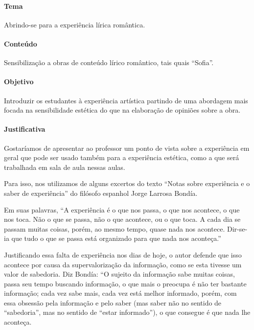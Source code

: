 \documentclass[12pt]{extarticle}
\begin{document}
\paragraph{Tema} Abrindo-se para a experiência lírica romântica.

\paragraph{Conteúdo} Sensibilização a obras de conteúdo lírico romântico,
tais quais ``Sofia''.

\paragraph{Objetivo} Introduzir os estudantes à experiência artística
partindo de uma abordagem mais focada na sensibilidade estética do que
na elaboração de opiniões sobre a obra. 

\paragraph{Justificativa} Gostaríamos de apresentar ao professor um
ponto de vista sobre a experiência em geral que pode ser usado
também para a experiência estética, como a que será trabalhada em 
sala de aula nessas aulas. 

Para isso, nos utilizamos de alguns excertos do texto ``Notas sobre
experiência e o saber de experiência'' do filósofo espanhol Jorge
Larrosa Bondía. 

Em suas palavras, ``A experiência é o que nos passa, 
o que nos acontece, o que nos toca. Não o que se passa, não o que acontece, ou o que toca. A cada dia se 
passam muitas coisas, porém, ao mesmo tempo, quase nada nos acontece. 
Dir-se-ia que tudo o que se passa está organizado para que nada nos aconteça.''

Justificando essa falta de experiência nos dias de hoje, 
o autor defende que isso acontece por causa da supervalorização
da informação, como se esta tivesse um valor de sabedoria. Diz Bondía: 
``O sujeito da informação sabe
muitas coisas, passa seu tempo buscando informação,
o que mais o preocupa é não ter bastante informação;
cada vez sabe mais, cada vez está melhor informado,
porém, com essa obsessão pela informação e pelo saber (mas saber não no sentido 
de “sabedoria”, mas no
sentido de “estar informado”), o que consegue é que
nada lhe aconteça.
\end{document}
